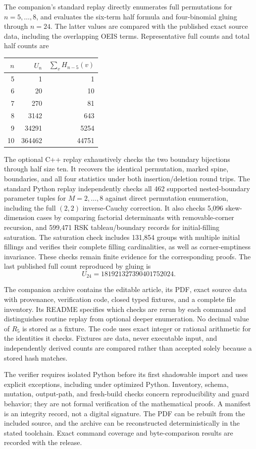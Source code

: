 \documentclass[11pt,letterpaper]{article}
\theoremstyle{remark}\newtheorem{remark}[theorem]{Remark}
\numberwithin{equation}{section}
\begin{document}
The companion's standard replay directly enumerates full permutations
for $n=5,\ldots,8$, and evaluates the six-term half formula and
four-binomial gluing through $n=24$. The latter values are compared
with the published exact source data, including the overlapping
OEIS terms. Representative full counts and total half counts are
\begin{center}
\begin{tabular}{r r r}
\toprule
$n$&$U_n$&$\sum_v H_{n-5}(v)$\\
\midrule
5&1&1\\6&20&10\\7&270&81\\8&3142&643\\
9&34291&5254\\10&364462&44751\\
\bottomrule
\end{tabular}
\end{center}
The optional C++ replay exhaustively checks the two boundary
bijections through half size ten. It recovers the identical
permutation, marked spine, boundaries, and all four statistics under
both insertion/deletion round trips. The standard Python replay
independently checks all 462 supported nested-boundary parameter
tuples for $M=2,\ldots,8$ against direct permutation enumeration,
including the full $(2,2)$ inverse-Cauchy correction. It also checks
5,096 skew-dimension cases by comparing factorial determinants
with removable-corner recursion, and 599,471 RSK tableau/boundary
records for initial-filling saturation. The saturation check includes
131,854 groups with multiple initial fillings and verifies their
complete filling cardinalities, as well as corner-emptiness
invariance. These checks remain finite evidence for the corresponding
proofs. The last published full count reproduced by gluing is
\[
 U_{24}=181921327390401752024.
\]

The companion archive contains the editable article, its PDF, exact
source data with provenance, verification code, closed typed
fixtures, and a complete file inventory. Its README specifies which
checks are rerun by each command and distinguishes routine replay
from optional deeper enumeration. No decimal value of $R_5$ is
stored as a fixture. The code uses exact integer or rational
arithmetic for the identities it checks. Fixtures are data, never
executable input, and independently derived counts are compared
rather than accepted solely because a stored hash matches.

The verifier requires isolated Python before its first shadowable
import and uses explicit exceptions, including under optimized
Python. Inventory, schema, mutation, output-path, and fresh-build
checks concern reproducibility and guard behavior; they are not
formal verification of the mathematical proofs. A manifest is an
integrity record, not a digital signature. The PDF can be rebuilt
from the included source, and the archive can be reconstructed
deterministically in the stated toolchain. Exact command coverage
and byte-comparison results are recorded with the release.
\end{document}
